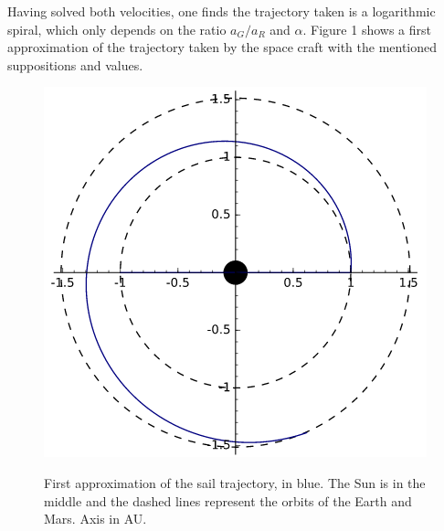 \documentclass[twocolumn,12pt,a4paper]{article}
\numberwithin{equation}{section}
\begin{document}
Having solved both velocities, one finds the trajectory taken is a logarithmic spiral, which only depends on the ratio \(a_G/a_R\) and $\alpha$.
Figure 1 shows a first approximation of the trajectory taken by the space craft with the mentioned suppositions and values.

\begin{figure}[h]
	\centering
	\includegraphics[scale=0.5]{espiral.png}
	\label{espiral}
	\caption{\small First approximation of the sail trajectory, in blue. The Sun is in the middle and the dashed lines represent the orbits of the Earth and Mars. Axis in AU.}
	\label{fig: first}
	
\end{figure}
\end{document}
